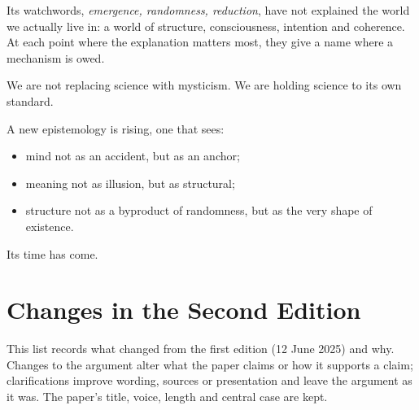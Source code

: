 \documentclass[11pt,a4paper]{article}
\begin{document}
Its watchwords, \textit{emergence, randomness, reduction}, have not explained the world we actually live in: a world of structure, consciousness, intention and coherence. At each point where the explanation matters most, they give a name where a mechanism is owed.

We are not replacing science with mysticism. We are holding science to its own standard.

A new epistemology is rising, one that sees:
\begin{itemize}
  \item mind not as an accident, but as an anchor;
  \item meaning not as illusion, but as structural;
  \item structure not as a byproduct of randomness, but as the very shape of existence.
\end{itemize}

Its time has come.

\clearpage
\section*{Changes in the Second Edition}

This list records what changed from the first edition (12 June 2025) and why. Changes to the argument alter what the paper claims or how it supports a claim; clarifications improve wording, sources or presentation and leave the argument as it was. The paper's title, voice, length and central case are kept.
\end{document}

